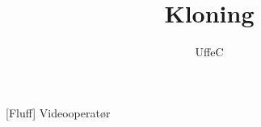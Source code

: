 \documentclass[a4paper,11pt]{article}
\title{Kloning}
\author{UffeC}
\begin{document}
\maketitle

\begin{roles}
[Fluff] Videooperatør
\end{roles}

\begin{props}
\prop{}
\end{props}

\begin{sketch}


\end{sketch}
\end{document}
